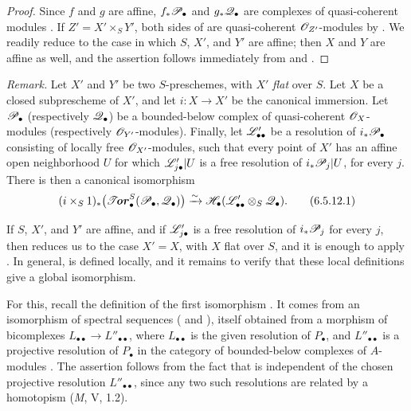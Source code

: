 \begin{proof}
Since $f$ and $g$ are affine, $f_*\mathscr{P}_\bullet$ and
$g_*\mathscr{Q}_\bullet$ are complexes of quasi-coherent modules
.  If $Z'=X'\times_SY'$, both sides of
 are quasi-coherent $\mathscr{O}_{Z'}$-modules by
.  We readily reduce to the case in which $S$,
$X'$, and $Y'$ are affine; then $X$ and $Y$ are affine as well,
and the assertion follows immediately from
 and .
\end{proof}

\begin{env}[6.5.12]
\label{III.6.5.12}
\emph{Remark.}
Let $X'$ and $Y'$ be two $S$-preschemes, with $X'$ \emph{flat} over
$S$.  Let $X$ be a closed subprescheme of $X'$, and let
$i:X\to X'$ be the canonical immersion.  Let $\mathscr{P}_\bullet$
(respectively $\mathscr{Q}_\bullet$) be a bounded-below complex of
quasi-coherent $\mathscr{O}_X$-modules (respectively
$\mathscr{O}_{Y'}$-modules).  Finally, let $\mathscr{L}'_{\bullet\bullet}$
be a resolution of $i_*\mathscr{P}_\bullet$ consisting of locally free
$\mathscr{O}_{X'}$-modules, such that every point of $X'$ has an
affine open neighborhood $U$ for which
$\mathscr{L}'_{j\bullet}|U$ is a free resolution of
$i_*\mathscr{P}_j|U$, for every $j$.  There is then a canonical
isomorphism
\[
  (i\times_S1)_*
  \bigl(\boldsymbol{\mathscr{T}\!\mathit{or}}_\bullet^S(\mathscr{P}_\bullet,\mathscr{Q}_\bullet)\bigr)
  \xrightarrow{\sim}
  \mathscr{H}_\bullet(\mathscr{L}'_{\bullet\bullet}\otimes_S\mathscr{Q}_\bullet).
  \tag{6.5.12.1}\label{III.6.5.12.1}
\]

If $S$, $X'$, and $Y'$ are affine, and if
$\mathscr{L}'_{j\bullet}$ is a free resolution of $i_*\mathscr{P}_j$ for
every $j$, then  reduces us to the case
$X'=X$, with $X$ flat over $S$, and it is enough to apply
.  In general,  is defined
locally, and it remains to verify that these local definitions
give a global isomorphism.

For this, recall the definition of the first isomorphism
.  It comes from an isomorphism of spectral
sequences ( and ), itself
obtained from a morphism of bicomplexes $L_{\bullet\bullet}\longrightarrow L''_{\bullet\bullet}$,
where $L_{\bullet\bullet}$ is the given resolution of
$P_\bullet$, and
$L''_{\bullet\bullet}$ is a projective resolution of
$P_\bullet$ in the category of bounded-below complexes of
$A$-modules .  The assertion follows from
the fact that  is independent of the chosen
projective resolution $L''_{\bullet\bullet}$, since any two such
resolutions are related by a homotopism (\emph{M}, V, 1.2).
\end{env}

